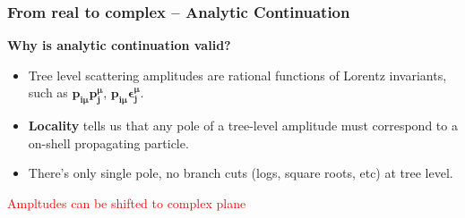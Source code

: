 \documentclass{beamer}
\begin{document}
\begin{frame}
    \frametitle{From real to complex -- Analytic Continuation}
    \textbf{Why is analytic continuation valid?}
\begin{itemize}
  \item Tree level scattering amplitudes are rational functions of Lorentz invariants, such as $\bm{p_{i\mu}p_j^\mu}$, $\bm{p_{i\mu}\epsilon_j^\mu}$.
  \item \textbf{Locality} tells us that any pole of a tree-level amplitude must correspond to a on-shell propagating particle. 
  \item There's only single pole, no branch cuts (logs, square roots, etc) at tree level.
\end{itemize}
    \begin{center}
    \end{center}
\vspace{0.5em}
\centering
\textcolor{red}{Ampltudes can be shifted to complex plane}
\end{frame}
\end{document}
